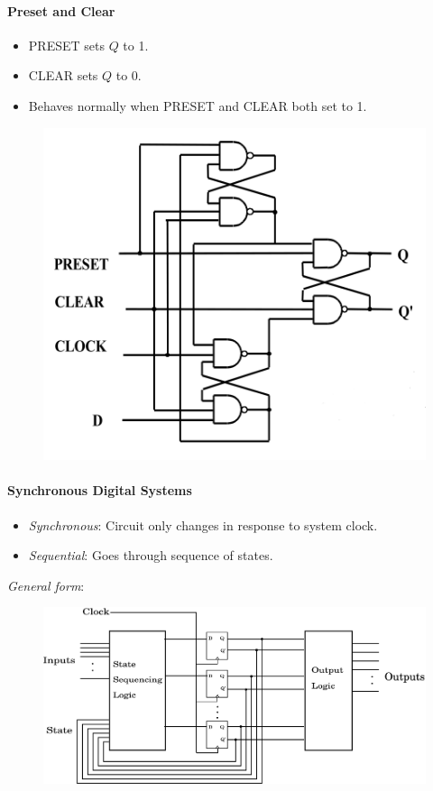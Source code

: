 \documentclass[twocolumn,english]{article}
\begin{document}
\paragraph{Preset and Clear}
\begin{itemize}
\item PRESET sets $Q$ to 1.
\item CLEAR sets $Q$ to 0.
\item Behaves normally when PRESET and CLEAR both set to 1.
\end{itemize}
\begin{figure}[H]
\noindent \centering{}\includegraphics[width=0.2\paperwidth]{img/preset-clear}
\end{figure}



\paragraph{Synchronous Digital Systems}
\begin{itemize}
\item \emph{Synchronous}: Circuit only changes in response to system clock.
\item \emph{Sequential}: Goes through sequence of states.
\end{itemize}
\emph{General form}: 
\begin{figure}[H]
\noindent \centering{}\includegraphics[width=0.3\paperwidth]{img/seqcircuit}
\end{figure}
\end{document}
